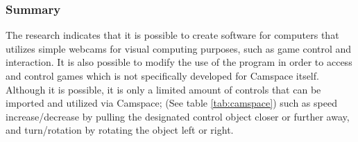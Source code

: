 \subsubsection*{Summary}
The research indicates that it is possible to create software for computers that utilizes simple webcams for visual computing purposes, such as game control and interaction. It is also possible to modify the use of the program in order to access and control games which is not specifically developed for Camspace itself. Although it is possible, it is only a limited amount of controls that can be imported and utilized via Camspace; (See table \ref{tab:camspace})  such as speed increase/decrease by pulling the designated control object closer or further away, and turn/rotation by rotating the object left or right.